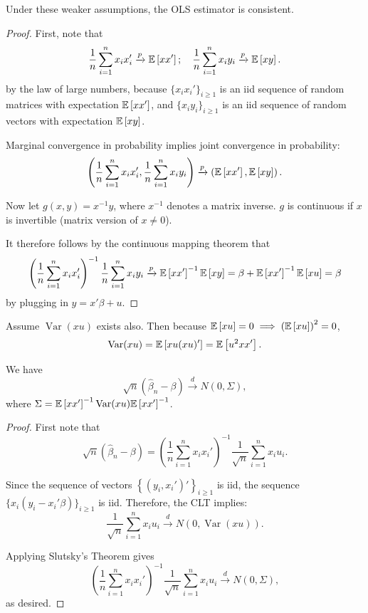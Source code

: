 \begin{proposition}[Consistency]
	Under these weaker assumptions, the OLS estimator is consistent.
\end{proposition}
\begin{proof}
	First, note that \[
		\frac{1}{n} \sum_{i=1}^{n} x_i x_i' \xrightarrow{p} \mathbb{E}\left[xx'\right] ; \quad \frac{1}{n} \sum_{i=1}^{n} x_i y_i \xrightarrow{p} \mathbb{E}\left[xy\right] 
	.\] 
	by the law of large numbers, because $\{x_i x_i'\}_{i \ge 1}$ is an iid sequence of random matrices with expectation $\mathbb{E}\left[xx'\right] $, and $\{x_i y_i\}_{i \ge 1}$ is an iid sequence of random vectors with expectation $\mathbb{E}\left[xy\right] $.

	Marginal convergence in probability implies joint convergence in probability: \[
		\left( \frac{1}{n} \sum_{i=1}^{n} x_i x_i', \frac{1}{n} \sum_{i=1}^{n} x_i y_i \right) \xrightarrow{p} \left( \mathbb{E}\left[xx'\right] , \mathbb{E}\left[xy\right]  \right) 
	.\] 
	
	Now let $g(x,y) = x^{-1}y$, where $x^{-1}$ denotes a matrix inverse. $g$ is continuous if $x$ is invertible (matrix version of $x \ne 0$).
	
	It therefore follows by the continuous mapping theorem that \[
		\left( \frac{1}{n} \sum_{i=1}^{n} x_i x_i' \right)^{-1} \frac{1}{n} \sum_{i=1}^{n} x_i y_i \xrightarrow{p} \mathbb{E}\left[xx'\right] ^{-1} \mathbb{E}\left[xy\right] = \beta + \mathbb{E}\left[xx'\right] ^{-1} \mathbb{E}\left[xu\right] = \beta
	\] by plugging in $y = x' \beta + u$. 
\end{proof}

\begin{proposition}
	Assume $\operatorname{Var}(xu)$ exists also. Then because $\mathbb{E}\left[xu\right] = 0 \implies \left( \mathbb{E}\left[xu\right]  \right)^2 = 0$, \[
		\operatorname{Var}(xu) = \mathbb{E}\left[xu(xu)'\right] = \mathbb{E}\left[u^2 xx'\right] 
	.\] 
	
	We have \[
		\sqrt{n} \left( \hat{\beta}_n - \beta \right) \xrightarrow{d} N(0, \Sigma)
	,\] where $\Sigma = \mathbb{E}\left[xx'\right] ^{-1} \operatorname{Var}(xu) \mathbb{E}\left[xx'\right] ^{-1}$.
\end{proposition}

\begin{proof}
	First note that \[
		\sqrt{n} \left( \hat{\beta}_n - \beta \right) = \left( \frac{1}{n} \sum_{i=1}^{n} x_i x_i' \right)^{-1} \frac{1}{\sqrt{n}} \sum_{i=1}^{n} x_i u_i
	.\] 

	Since the sequence of vectors $\left\{ (y_i, x_i')' \right\}_{i \ge 1}$ is iid, the sequence $\{x_i (y_i - x_i' \beta)\}_{i \ge 1}$ is iid. Therefore, the CLT implies: \[
		\frac{1}{\sqrt{n}} \sum_{i=1}^{n} x_i u_i \xrightarrow{d} N(0, \operatorname{Var}(xu))
	.\] 
	
	Applying Slutsky's Theorem gives \[
		\left( \frac{1}{n} \sum_{i=1}^{n} x_i x_i' \right)^{-1} \frac{1}{\sqrt{n}} \sum_{i=1}^{n} x_i u_i \xrightarrow{d} N(0, \Sigma)
	,\] as desired.
\end{proof}

